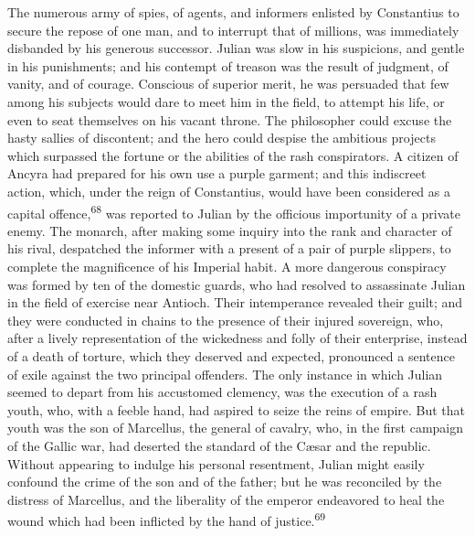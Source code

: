 The numerous army of spies, of agents, and informers enlisted by
Constantius to secure the repose of one man, and to interrupt
that of millions, was immediately disbanded by his generous
successor. Julian was slow in his suspicions, and gentle in his
punishments; and his contempt of treason was the result of
judgment, of vanity, and of courage. Conscious of superior merit,
he was persuaded that few among his subjects would dare to meet
him in the field, to attempt his life, or even to seat themselves
on his vacant throne. The philosopher could excuse the hasty
sallies of discontent; and the hero could despise the ambitious
projects which surpassed the fortune or the abilities of the rash
conspirators. A citizen of Ancyra had prepared for his own use a
purple garment; and this indiscreet action, which, under the
reign of Constantius, would have been considered as a capital
offence,\textsuperscript{68} was reported to Julian by the officious importunity
of a private enemy. The monarch, after making some inquiry into
the rank and character of his rival, despatched the informer with
a present of a pair of purple slippers, to complete the
magnificence of his Imperial habit. A more dangerous conspiracy
was formed by ten of the domestic guards, who had resolved to
assassinate Julian in the field of exercise near Antioch. Their
intemperance revealed their guilt; and they were conducted in
chains to the presence of their injured sovereign, who, after a
lively representation of the wickedness and folly of their
enterprise, instead of a death of torture, which they deserved
and expected, pronounced a sentence of exile against the two
principal offenders. The only instance in which Julian seemed to
depart from his accustomed clemency, was the execution of a rash
youth, who, with a feeble hand, had aspired to seize the reins of
empire. But that youth was the son of Marcellus, the general of
cavalry, who, in the first campaign of the Gallic war, had
deserted the standard of the Cæsar and the republic. Without
appearing to indulge his personal resentment, Julian might easily
confound the crime of the son and of the father; but he was
reconciled by the distress of Marcellus, and the liberality of
the emperor endeavored to heal the wound which had been inflicted
by the hand of justice.\textsuperscript{69}


